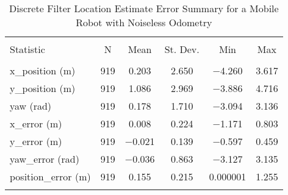 
\begin{table}[htbp] \centering 
  \caption{Discrete Filter Location Estimate Error Summary for a Mobile Robot with Noiseless Odometry}
  \label{tab:one_mobile_noiseless_discrete_summary} 
\begin{tabular}{@{\extracolsep{5pt}}lccccc} 
\\[-1.8ex]\hline 
\hline \\[-1.8ex] 
Statistic & \multicolumn{1}{c}{N} & \multicolumn{1}{c}{Mean} & \multicolumn{1}{c}{St. Dev.} & \multicolumn{1}{c}{Min} & \multicolumn{1}{c}{Max} \\ 
\hline \\[-1.8ex] 
x\_position (m) & 919 & \num{0.203} & \num{2.650} & \num{-4.260} & \num{3.617} \\ 
y\_position (m) & 919 & \num{1.086} & \num{2.969} & \num{-3.886} & \num{4.716} \\ 
yaw (rad) & 919 & \num{0.178} & \num{1.710} & \num{-3.094} & \num{3.136} \\ 
x\_error (m) & 919 & \num{0.008} & \num{0.224} & \num{-1.171} & \num{0.803} \\ 
y\_error (m) & 919 & \num{-0.021} & \num{0.139} & \num{-0.597} & \num{0.459} \\ 
yaw\_error (rad) & 919 & \num{-0.036} & \num{0.863} & \num{-3.127} & \num{3.135} \\ 
position\_error (m) & 919 & \num{0.155} & \num{0.215} & \num{0.000001} & \num{1.255} \\ 
\hline \\[-1.8ex] 
\end{tabular} 
\end{table} 
